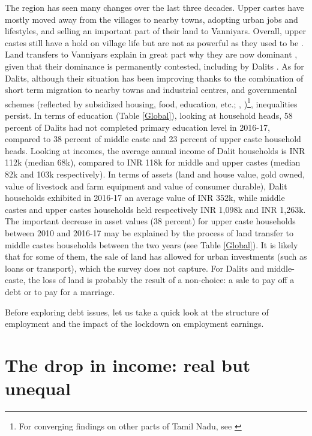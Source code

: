 \documentclass[a4paper, 11pt, onecolumn]{article}
\begin{document}
The region has seen many changes over the last three decades. 
Upper castes have mostly moved away from the villages to nearby towns, adopting urban jobs and lifestyles, and selling an important part of their land to Vanniyars. 
Overall, upper castes still have a hold on village life but are not as powerful as they used to be \citep{Harriss2013}. 
Land transfers to Vanniyars explain in great part why they are now dominant \citep{Harriss2016}, given that their dominance is permanently contested, including by Dalits \citep{Pandian2000}. 
As for Dalits, although their situation has been improving thanks to the combination of short term migration to nearby towns and industrial centres, and governmental schemes (reflected by subsidized housing, food, education, etc.; \citeauthor{Guerin2014}, \citeyear{Guerin2014})\footnote{For converging findings on other parts of Tamil Nadu, see \cite{Heyer2012, Harriss2016}}, inequalities persist.
In terms of education (Table \ref{Global}), looking at household heads, 58 percent of Dalits had not completed primary education level in 2016-17, compared to 38 percent of middle caste and 23 percent of upper caste household heads. 
Looking at incomes, the average annual income of Dalit households is INR 112k (median 68k), compared to INR 118k for middle and upper castes (median 82k and 103k respectively).
In terms of assets (land and house value, gold owned, value of livestock and farm equipment and value of consumer durable), Dalit households exhibited in 2016-17 an average value of INR 352k, while middle castes and upper castes households held respectively INR 1,098k and INR 1,263k.
The important decrease in asset values (38 percent) for upper caste households between 2010 and 2016-17 may be explained by the process of land transfer to middle castes households between the two years (see Table \ref{Global}).
It is likely that for some of them, the sale of land has allowed for urban investments (such as loans or transport), which the survey does not capture. 
For Dalits and middle-caste, the loss of land is probably the result of a non-choice: a sale to pay off a debt or to pay for a marriage.

Before exploring debt issues, let us take a quick look at the structure of employment and the impact of the lockdown on employment earnings.



\section{The drop in income: real but unequal}
\label{section:income}
\end{document}
